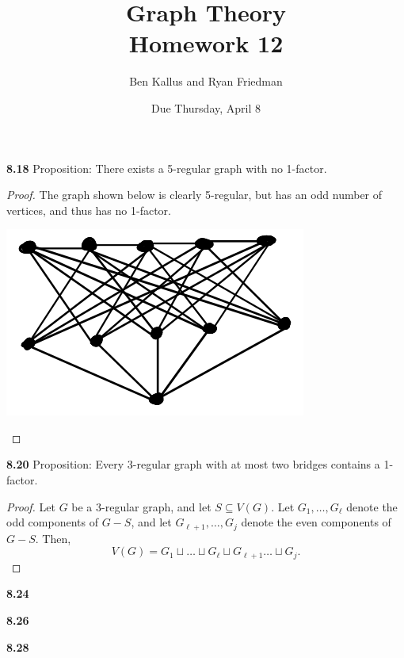 \documentclass[12pt]{article}
\title{Graph Theory \\ Homework 12}
\author{Ben Kallus and Ryan Friedman}
\date{Due Thursday, April 8}
\begin{document}
\maketitle

\medskip\noindent\textbf{8.18} Proposition: There exists a 5-regular graph with no 1-factor.
\begin{proof}
    The graph shown below is clearly 5-regular, but has an odd number of vertices, and thus has no 1-factor.
    \begin{center}\includegraphics{pic1.png}\end{center}
\end{proof}

\newpage\noindent\textbf{8.20} Proposition: Every 3-regular graph with at most two bridges contains a 1-factor.
\begin{proof}
    Let $G$ be a 3-regular graph, and let $S \subseteq V(G)$.
    Let $G_1, \hdots, G_\ell$ denote the odd components of $G-S$, and let $G_{\ell+1}, \hdots, G_j$ denote the even components of $G-S$.
    Then, $$V(G) = G_1 \sqcup \hdots \sqcup G_{\ell} \sqcup G_{\ell+1} \hdots \sqcup G_j.$$
\end{proof}

\newpage\noindent\textbf{8.24}



\newpage\noindent\textbf{8.26}



\newpage\noindent\textbf{8.28}
\end{document}

